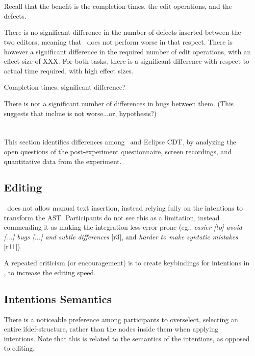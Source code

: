 \section{\RQB}
Recall that the benefit is the completion times, the edit operations, and the defects. 


There is no significant difference in the number of defects inserted between the two editors, meaning that \tooln~does not perform worse in that respect. There is however a significant difference in the required number of edit operations, with an effect size of XXX. For both tasks, there is a significant difference with respect to actual time required, with high effect sizes.

Completion times, significant difference?

There is not a significant number of differences in bugs between them. (This suggests that incline is not worse...or, hypothesis?)


\section{\RQC}
This section identifies differences among \tooln~and Eclipse CDT, by analyzing the open questions of the post-experiment questionnaire, screen recordings, and quantitative data from the experiment. 

\subsection{Editing}
\tooln~does not allow manual text insertion, instead relying fully on the intentions to transform the AST. Participants do not see this as a limitation, instead commending it as making the integration less-error prone (eg., \textit{\bc easier [to] avoid [...] bugs [...] and subtle differences\ec} [r3], and \textit{\bc harder to make syntatic mistakes\ec} [r11]).

A repeated criticism (or encouragement) is to create keybindings for intentions in \tooln, to increase the editing speed.


\subsection{Intentions Semantics}
There is a noticeable preference among participants to overselect, selecting an entire ifdef-structure, rather than the nodes inside them when applying intentions. Note that this is related to the semantics of the intentions, as opposed to editing.

